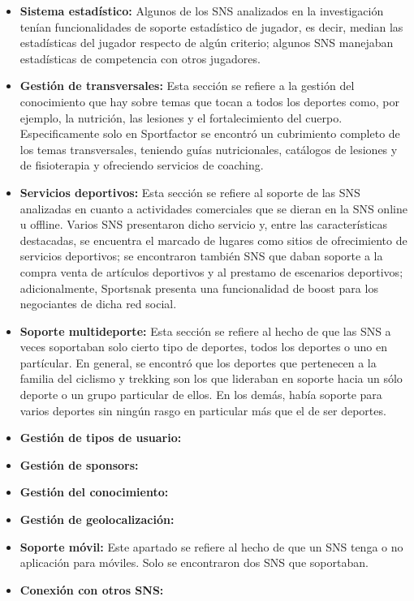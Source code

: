 \begin{itemize}
	\item \textbf{Sistema estadístico:} Algunos de los SNS analizados en la investigación tenían funcionalidades de soporte estadístico de jugador, es decir, median las estadísticas del jugador respecto de algún criterio; algunos SNS manejaban estadísticas de competencia con otros jugadores.
	\item \textbf{Gestión de transversales:} Esta sección se refiere a la gestión del conocimiento que hay sobre temas que tocan a todos los deportes como, por ejemplo, la nutrición, las lesiones y el fortalecimiento del cuerpo. Especificamente solo en Sportfactor se encontró un cubrimiento completo de los temas transversales, teniendo guías nutricionales, catálogos de lesiones y de fisioterapia y ofreciendo servicios de coaching. 
	\item \textbf{Servicios deportivos:} Esta sección se refiere al soporte de las SNS analizadas en cuanto a actividades comerciales que se dieran en la SNS online u offline. Varios SNS presentaron dicho servicio y, entre las características destacadas, se encuentra el marcado de lugares como sitios de ofrecimiento de servicios deportivos; se encontraron también SNS que daban soporte a la compra venta de artículos deportivos y al prestamo de escenarios deportivos; adicionalmente, Sportsnak presenta una funcionalidad de boost para los negociantes de dicha red social.
	\item \textbf{Soporte multideporte:} Esta sección se refiere al hecho de que las SNS a veces soportaban solo cierto tipo de deportes, todos los deportes o uno en partícular. En general, se encontró que los deportes que pertenecen a la familia del ciclismo y trekking son los que lideraban en soporte hacia un sólo deporte o un grupo particular de ellos. En los demás, había soporte para varios deportes sin ningún rasgo en particular más que el de ser deportes.
	\item \textbf{Gestión de tipos de usuario:}
	\item \textbf{Gestión de sponsors:}
	\item \textbf{Gestión del conocimiento:}
	\item \textbf{Gestión de geolocalización:}
	\item \textbf{Soporte móvil:} Este apartado se refiere al hecho de que un SNS tenga o no aplicación para móviles. Solo se encontraron dos SNS que soportaban.
	\item \textbf{Conexión con otros SNS:}
\end{itemize}

